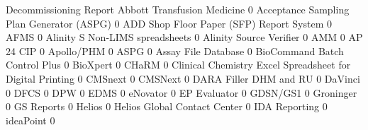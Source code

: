 \documentclass{article}
\begin{document}
\begin{Schunk}
\begin{Soutput}
                                                            Decommissioning Report
  Abbott Transfusion Medicine                                                    0
  Acceptance Sampling Plan Generator (ASPG)                                      0
  ADD Shop Floor Paper (SFP) Report System                                       0
  AFMS                                                                           0
  Alinity S Non-LIMS spreadsheets                                                0
  Alinity Source Verifier                                                        0
  AMM                                                                            0
  AP 24 CIP                                                                      0
  Apollo/PHM                                                                     0
  ASPG                                                                           0
  Assay File Database                                                            0
  BioCommand Batch Control Plus                                                  0
  BioXpert                                                                       0
  CHaRM                                                                          0
  Clinical Chemistry Excel Spreadsheet for Digital Printing                      0
  CMSnext                                                                        0
  CMSNext                                                                        0
  DARA Filler DHM and RU                                                         0
  DaVinci                                                                        0
  DFCS                                                                           0
  DPW                                                                            0
  EDMS                                                                           0
  eNovator                                                                       0
  EP Evaluator                                                                   0
  GDSN/GS1                                                                       0
  Groninger                                                                      0
  GS Reports                                                                     0
  Helios                                                                         0
  Helios Global Contact Center                                                   0
  IDA Reporting                                                                  0
  ideaPoint                                                                      0

\end{Soutput}
\end{Schunk}
\end{document}
